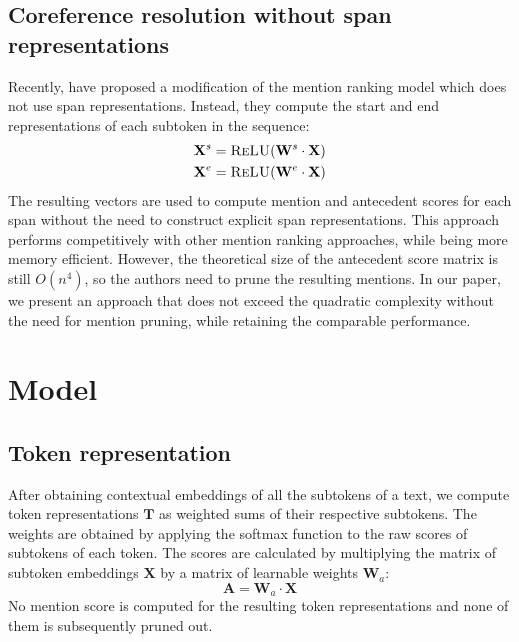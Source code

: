 \documentclass[11pt]{article}
\begin{document}
\subsection{Coreference resolution without span representations}
Recently, \citet{kirstain-etal-2021-no-span} have proposed a modification of the mention ranking model which does not use span representations. Instead, they compute the start and end representations of each subtoken in the sequence:
\begin{align}
    \mathbf{X}^s &= \textsc{ReLU}(\mathbf{W}^s \cdot \mathbf{X}) \\
    \mathbf{X}^e &= \textsc{ReLU}(\mathbf{W}^e \cdot \mathbf{X})
\end{align}
The resulting vectors are used to compute mention and antecedent scores for each span without the need to construct explicit span representations. This approach performs competitively with other mention ranking approaches, while being more memory efficient. However, the theoretical size of the antecedent score matrix is still $O(n^4)$, so the authors need to prune the resulting mentions. In our paper, we present an approach that does not exceed the quadratic complexity without the need for mention pruning, while retaining the comparable performance.

\section{Model}
\subsection{Token representation}
After obtaining contextual embeddings of all the subtokens of a text, we compute token representations $\mathbf{T}$ as weighted sums of their respective subtokens. The weights are obtained by applying the softmax function to the raw scores of subtokens of each token. The scores are calculated by multiplying the matrix of subtoken embeddings $\mathbf{X}$ by a matrix of learnable weights $\mathbf{W}_a$:
\begin{equation}
    \mathbf{A} = \mathbf{W}_a \cdot \mathbf{X}
\end{equation}
No mention score is computed for the resulting token representations and none of them is subsequently pruned out.
\end{document}

